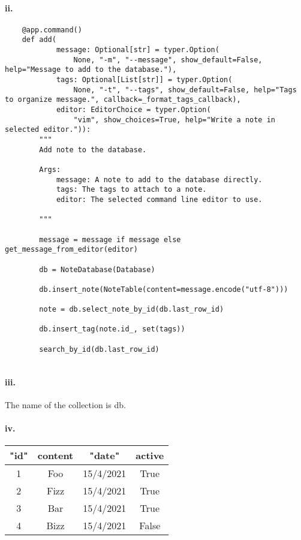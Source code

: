 \documentclass[12pt]{report}
\begin{document}
\paragraph{ii.}
\begin{lstlisting}
    @app.command()
    def add(
            message: Optional[str] = typer.Option(
                None, "-m", "--message", show_default=False, help="Message to add to the database."),
            tags: Optional[List[str]] = typer.Option(
                None, "-t", "--tags", show_default=False, help="Tags to organize message.", callback=_format_tags_callback),
            editor: EditorChoice = typer.Option(
                "vim", show_choices=True, help="Write a note in selected editor.")):
        """
        Add note to the database.
    
        Args:
            message: A note to add to the database directly.
            tags: The tags to attach to a note.
            editor: The selected command line editor to use.
    
        """
    
        message = message if message else get_message_from_editor(editor)
    
        db = NoteDatabase(Database)
    
        db.insert_note(NoteTable(content=message.encode("utf-8")))
    
        note = db.select_note_by_id(db.last_row_id)
    
        db.insert_tag(note.id_, set(tags))
    
        search_by_id(db.last_row_id)
    
\end{lstlisting}

\paragraph{iii.}
The name of the collection is db.

\paragraph{iv.}

\begin{center}
 \begin{tabular}{||c c c c||} 
 \hline
 "id" & content & "date" & active\\ [0.5ex] 
 \hline\hline
 1 & Foo & 15/4/2021 & True \\ 
 \hline
 2 & Fizz & 15/4/2021 & True \\ 
 \hline
 3 & Bar & 15/4/2021 & True \\ 
 \hline
 4 & Bizz & 15/4/2021 & False \\ 
 \hline
\end{tabular}
\end{center}
\end{document}

